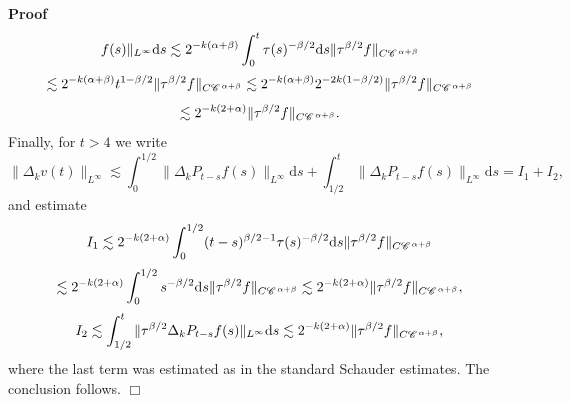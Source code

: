 \documentclass[a4paper,11pt]{article}
\newcommand{\mathd}{\mathrm{d}}
\newenvironment{proof}{\noindent\textbf{Proof\ }}{\hspace*{\fill}$\Box$\medskip}
\numberwithin{equation}{section}
\newcommand{\CC}{\mathscr{C} \hspace{.1em}}
\newcommand{\8}{\infty}
\begin{document}
\begin{proof}
\[     f (s) \|_{L^{\infty}} \mathd s \lesssim 2^{- k (\alpha + \beta)} \int_0^t
     \tau (s)^{- \beta / 2} \mathd s \| \tau^{\beta / 2} f\|_{C \CC^{\alpha +
     \beta}} \]
  \[ \lesssim 2^{- k (\alpha + \beta)} t^{1 - \beta / 2} \| \tau^{\beta / 2}
     f\|_{C \CC^{\alpha + \beta}} \lesssim 2^{- k (\alpha + \beta)} 2^{- 2 k
     (1 - \beta / 2)} \| \tau^{\beta / 2} f\|_{C \CC^{\alpha + \beta}} \]
  \[ \lesssim 2^{- k (2 + \alpha)} \| \tau^{\beta / 2} f\|_{C \CC^{\alpha +
     \beta}} . \]
  Finally, for $t > 4$ we write
  \[ \| \Delta_k v (t) \|_{L^{\infty}} \lesssim \int_0^{1 / 2} \| \Delta_k
     P_{t - s} f (s) \|_{L^{\infty}} \mathd s + \int_{1 / 2}^t \| \Delta_k
     P_{t - s} f (s) \|_{L^{\infty}} \mathd s = I_1 + I_2, \]
  and estimate
  \[ I_1 \lesssim 2^{- k (2 + \alpha)} \int_0^{1 / 2} (t - s)^{\beta / 2 - 1}
     \tau (s)^{- \beta / 2} \mathd s \| \tau^{\beta / 2} f \|_{C \CC^{\alpha +
     \beta}} \]
  \[ \lesssim 2^{- k (2 + \alpha)} \int_0^{1 / 2} s^{- \beta / 2} \mathd s \|
     \tau^{\beta / 2} f \|_{C \CC^{\alpha + \beta}} \lesssim 2^{- k (2 +
     \alpha)} \| \tau^{\beta / 2} f \|_{C \CC^{\alpha + \beta}}, \]
  \[ I_2 \lesssim \int_{1 / 2}^t \| \tau^{\beta / 2} \Delta_k P_{t - s} f (s)
     \|_{L^{\infty}} \mathd s \lesssim 2^{- k (2 + \alpha)} \| \tau^{\beta /
     2} f \|_{C \CC^{\alpha + \beta}}, \]
  where the last term was estimated as in the standard Schauder estimates. The
  conclusion follows.
\end{proof}



%
%
\end{document}
